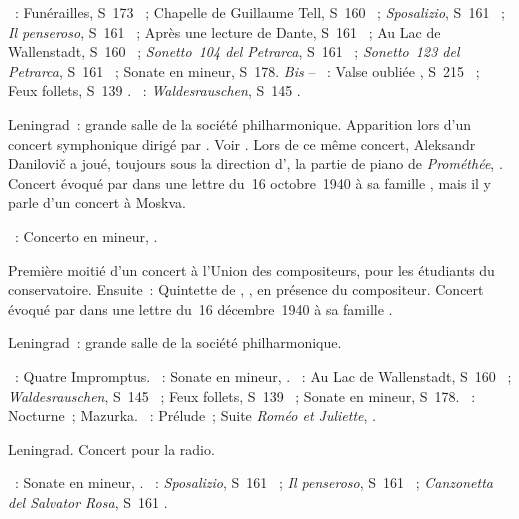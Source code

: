 \begin{description}
 \textsc{\Liszt{}}~: Funérailles, S~173 ~; Chapelle de Guillaume
 Tell, S~160 ~; \emph{Sposalizio}, S~161 ~; \emph{Il
 penseroso}, S~161 ~; Après une lecture de Dante, S~161
 ~; Au Lac de Wallenstadt, S~160 ~; \emph{Sonetto~104
 del Petrarca}, S~161 ~; \emph{Sonetto~123 del Petrarca}, S~161
 ~; Sonate en \kB mineur, S~178.
 \emph{Bis} -- \textsc{\Liszt{}}~: Valse oubliée , S~215
 ~; Feux follets, S~139 .
 \textsc{\Liszt{}}~: \emph{Waldesrauschen}, S~145 .
 \item[\DateWithWeekDay{1940-12-07}]
 Leningrad~: grande salle de la société philharmonique.
 Apparition lors d'un concert symphonique dirigé par \IMiklashevsky{}.
 Voir \citet{Lazarev20}.
 Lors de ce même concert, Aleksandr Danilovič \Kamensky{} a joué, toujours
 sous la direction d'\IMiklashevsky{}, la partie de piano de
 \emph{Prométhée},  \citep[voir aussi][p.~163]{Nekrasova08}.
 Concert évoqué par \VSofronitsky{} dans une lettre du~16 octobre~1940 à sa
 famille \citep[p.~29]{Kogan08}, mais il y parle d'un concert à Moskva.

 \textsc{\Scriabine{}}~: Concerto en \kF \Sharp mineur, .
 \item[\DateWithWeekDay{1940-12-13}]
 Première moitié d'un concert à l'\hbox{Union} des compositeurs, pour les
 étudiants du conservatoire.
 Ensuite~: Quintette de \DChostakovitch{}, , en présence du
 compositeur.
 Concert évoqué par \VSofronitsky{} dans une lettre du~16 décembre~1940 à sa
 famille \citep[p.~30]{Kogan08}.
 \item[\DateWithWeekDay{1940-12-21}]
 Leningrad~: grande salle de la société philharmonique.

 \textsc{\Schubert{}}~: Quatre Impromptus.
 \textsc{\Beethoven{}}~: Sonate en \kC \Sharp mineur,  .
 \textsc{\Liszt{}}~: Au Lac de Wallenstadt, S~160 ~;
 \emph{Waldesrauschen}, S~145 ~; Feux follets, S~139 ~;
 Sonate en \kB mineur, S~178.
 \textsc{\Chopin{}}~: Nocturne~; Mazurka.
 \textsc{\Prokofiev{}}~: Prélude~; Suite \emph{Roméo et Juliette},
 .
 \item[\DateWithWeekDay{1940-12-26}]
 Leningrad.
 Concert pour la radio.

 \textsc{\Beethoven{}}~: Sonate en \kC \Sharp mineur,  .
 \textsc{\Liszt{}}~: \emph{Sposalizio}, S~161 ~; \emph{Il
 penseroso}, S~161 ~; \emph{Canzonetta del Salvator Rosa}, S~161
 .
\end{description}


